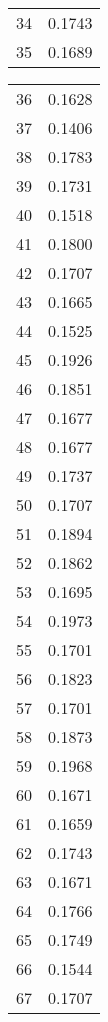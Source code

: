 \begin{multicols}{4}
\begin{table}[H]
\begin{tabular}{|c|r|}
            34  & 0.1743 \\
            35  & 0.1689 \\
            \hline
        \end{tabular}
    \end{table}
    \columnbreak
    \begin{table}[H]
        \centering
        \begin{tabular}{|c|r|}
            \hline
            36  & 0.1628 \\
            37  & 0.1406 \\
            38  & 0.1783 \\
            39  & 0.1731 \\
            40  & 0.1518 \\
            41  & 0.1800 \\
            42  & 0.1707 \\
            43  & 0.1665 \\
            44  & 0.1525 \\
            45  & 0.1926 \\
            46  & 0.1851 \\
            47  & 0.1677 \\
            48  & 0.1677 \\
            49  & 0.1737 \\
            50  & 0.1707 \\
            51  & 0.1894 \\
            52  & 0.1862 \\
            53  & 0.1695 \\
            54  & 0.1973 \\
            55  & 0.1701 \\
            56  & 0.1823 \\
            57  & 0.1701 \\
            58  & 0.1873 \\
            59  & 0.1968 \\
            60  & 0.1671 \\
            61  & 0.1659 \\
            62  & 0.1743 \\
            63  & 0.1671 \\
            64  & 0.1766 \\
            65  & 0.1749 \\
            66  & 0.1544 \\
            67  & 0.1707 \\

\end{tabular}
\end{table}
\end{multicols}
